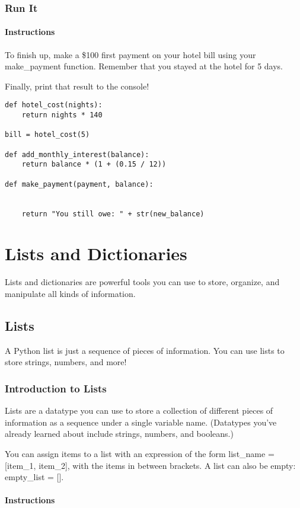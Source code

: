\documentclass[12pt,a4paper,final,twoside,onecolumn,titlepage]{book}
\begin{document}
\subsection{Run It}
\subsubsection{Instructions}

To finish up, make a \$100 first payment on your hotel bill using your make\_payment function. Remember that you stayed at the hotel for 5 days.

Finally, print that result to the console!

\begin{lstlisting}
def hotel_cost(nights):
    return nights * 140

bill = hotel_cost(5)

def add_monthly_interest(balance):
    return balance * (1 + (0.15 / 12))

def make_payment(payment, balance):
	
	
    return "You still owe: " + str(new_balance)
\end{lstlisting}

\chapter{Lists and Dictionaries}
Lists and dictionaries are powerful tools you can use to store, organize, and manipulate all kinds of information.
\section{Lists}
    A Python list is just a sequence of pieces of information. You can use lists to store strings, numbers, and more!
\subsection{Introduction to Lists}

Lists are a datatype you can use to store a collection of different pieces of information as a sequence under a single variable name. (Datatypes you've already learned about include strings, numbers, and booleans.)

You can assign items to a list with an expression of the form list\_name = [item\_1, item\_2], with the items in between brackets. A list can also be empty: empty\_list = [].
\subsubsection{Instructions}
\end{document}
